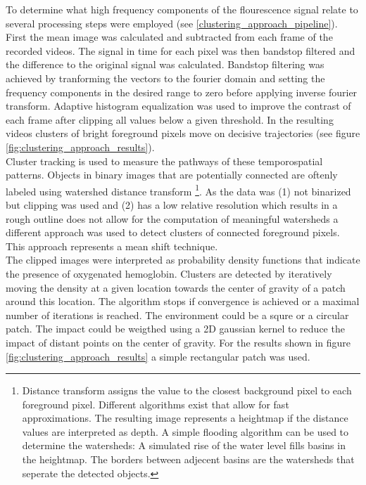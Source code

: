To determine what high frequency components of the flourescence signal relate to several processing steps were employed (see \ref{clustering_approach_pipeline}). First the mean image was calculated and subtracted from each frame of the recorded videos. The signal in time for each pixel was then bandstop filtered and the difference to the original signal was calculated. Bandstop filtering was achieved by tranforming the vectors to the fourier domain and setting the frequency components in the desired range to zero before applying inverse fourier transform. Adaptive histogram equalization was used to improve the contrast of each frame after clipping all values below a given threshold. In the resulting videos clusters of bright foreground pixels move on decisive trajectories (see figure \ref{fig:clustering_approach_results}).\\
Cluster tracking is used to measure the pathways of these temporospatial patterns. Objects in binary images that are potentially connected are oftenly labeled using watershed distance transform \parencite{arganda-carreras2016distance} \footnote{Distance transform assigns the value to the closest background pixel to each foreground pixel. Different algorithms exist that allow for fast approximations. The resulting image represents a heightmap if the distance values are interpreted as depth. A simple flooding algorithm can be used to determine the watersheds: A simulated rise of the water level fills basins in the heightmap. The borders between adjecent basins are the watersheds that seperate the detected objects.}. As the data was (1) not binarized but clipping was used and (2) has a low relative resolution which results in a rough outline does not allow for the computation of meaningful watersheds a different approach was used to detect clusters of connected foreground pixels. This approach represents a mean shift technique. \\
The clipped images were interpreted as probability density functions that indicate the presence of oxygenated hemoglobin. Clusters are detected by iteratively moving the density at a given location towards the center of gravity of a patch around this location. The algorithm stops if convergence is achieved or a maximal number of iterations is reached. The environment could be a squre or a circular patch. The impact could be weigthed using a 2D gaussian kernel to reduce the impact of distant points on the center of gravity. For the results shown in figure \ref{fig:clustering_approach_results} a simple rectangular patch was used. \\
